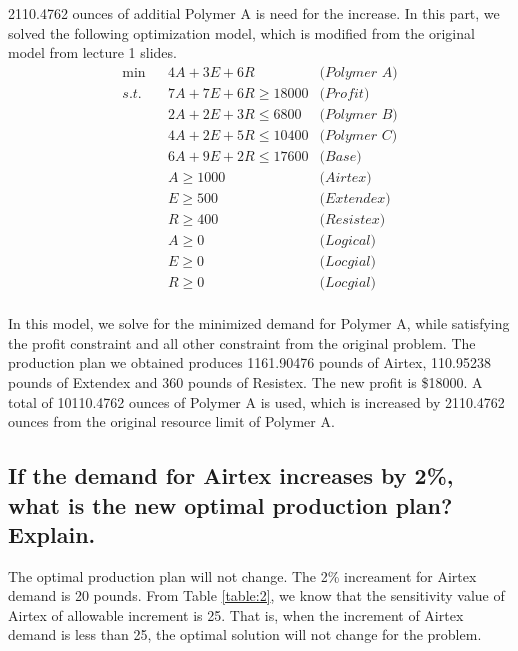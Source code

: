 \documentclass[11pt]{article}
\begin{document}
2110.4762 ounces of additial Polymer A is need for the increase. In this part, we solved the following optimization model, which is modified from the original model from lecture 1 slides. 
\begin{equation}
    \begin{aligned}
    & \min & & 4A + 3E + 6R & \textit{(Polymer A)} &\\
    & s.t. & & 7A + 7E + 6R \geq 18000 &\textit{(Profit)}&\\ 
    &&& 2A + 2E + 3R \leq 6800 &\textit{(Polymer B)} &\\
    &&& 4A + 2E + 5R \leq 10400 &\textit{(Polymer C)} &\\
    &&& 6A + 9E + 2R \leq 17600 &\textit{(Base)} &\\
    &&& A \geq 1000 &\textit{(Airtex)}& \\
    &&& E \geq 500 & \textit{(Extendex)} & \\
    &&& R \geq 400 & \textit{(Resistex)}& \\
    &&& A \geq 0 &\textit{(Logical)}& \\
    &&& E \geq 0 & \textit{(Locgial)} & \\
    &&& R \geq 0 & \textit{(Locgial)} & \\
    \end{aligned}
    \label{eq:1}
\end{equation}

In this model, we solve for the minimized demand for Polymer A, while satisfying the profit constraint and all other constraint from the original problem. The production plan we obtained produces 1161.90476 pounds of Airtex, 110.95238 pounds of Extendex and 360 pounds of Resistex. The new profit is \$18000. A total of 10110.4762 ounces of Polymer A is used, which is increased by 2110.4762 ounces from the original resource limit of Polymer A. 

\subsection{If the demand for Airtex increases by 2\%, what is the new optimal production plan? Explain.}

The optimal production plan will not change. The 2\% increament for Airtex demand is 20 pounds. From Table \ref{table:2}, we know that the sensitivity value of Airtex of allowable increment is 25. That is, when the increment of Airtex demand is less than 25, the optimal solution will not change for the problem. 

\end{document}
